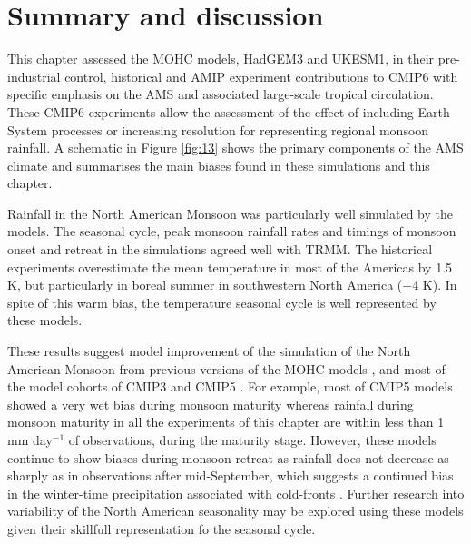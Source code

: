 \section{Summary and discussion}



 This chapter assessed the MOHC models, HadGEM3 and UKESM1, in their pre-industrial control, historical and AMIP experiment contributions to CMIP6 with specific emphasis on the AMS and associated large-scale tropical circulation. These CMIP6 experiments allow the assessment of the effect of including Earth System processes or increasing resolution for representing regional monsoon rainfall. 
A schematic in Figure \ref{fig:13} shows the primary components of the AMS climate and summarises the main biases found in these simulations and this chapter.



Rainfall in the North American Monsoon was particularly well simulated by the models. The seasonal cycle, peak monsoon rainfall rates and timings of monsoon onset and retreat in the simulations agreed well with TRMM. The historical experiments overestimate the mean temperature in most of the Americas by 1.5 K, but particularly in boreal summer in southwestern North America (+4 K). In spite of this warm bias, the temperature seasonal cycle is well represented by these models. 

  These results suggest model improvement of the simulation of the North American Monsoon from previous versions of the MOHC models \citep{arritt2000}, and most of the model cohorts of CMIP3 and CMIP5 \citep{geil2013}. For example, most of CMIP5 models showed a very wet bias during monsoon maturity whereas rainfall during monsoon maturity in all the experiments of this chapter are within less than 1 mm day$^{-1}$ of observations, during the maturity stage. However, these models continue to show biases during monsoon retreat as rainfall does not decrease as sharply as in observations after mid-September, which suggests a continued bias in the winter-time precipitation associated with cold-fronts \citep{adams1997}. Further research into variability of the North American seasonality may be explored using these models given their skillfull representation fo the seasonal cycle.

